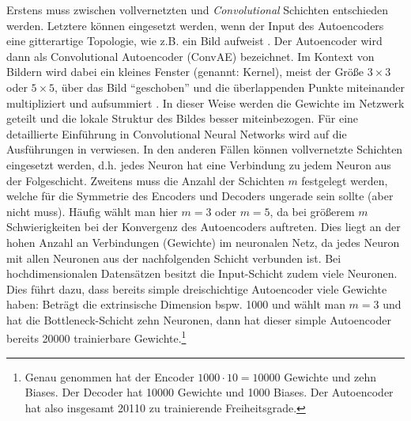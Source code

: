 Erstens muss zwischen vollvernetzten und \textit{Convolutional} Schichten entschieden werden.
Letztere können eingesetzt werden, wenn der Input des Autoencoders eine gitterartige Topologie, wie
z.B. ein Bild aufweist \parencite[330]{Goodfellow.2016}.
Der Autoencoder wird dann als Convolutional Autoencoder (ConvAE) bezeichnet. Im Kontext von Bildern
wird dabei ein kleines Fenster (genannt: Kernel), meist der Größe $3 \times 3$ oder $5 \times 5$,
über das Bild \enquote{geschoben} und die überlappenden Punkte miteinander multipliziert und
aufsummiert \parencite[333]{Goodfellow.2016}. In dieser Weise werden die Gewichte im Netzwerk geteilt und die
lokale Struktur des Bildes besser miteinbezogen. Für eine detaillierte Einführung in Convolutional
Neural Networks wird auf die Ausführungen in \textcite[330 -- 372]{Goodfellow.2016} verwiesen. In
den anderen Fällen können vollvernetzte Schichten eingesetzt werden, d.h. jedes Neuron hat eine
Verbindung zu jedem Neuron aus der Folgeschicht. Zweitens muss die Anzahl der Schichten $m$
festgelegt werden, welche für die Symmetrie des Encoders und Decoders ungerade sein sollte (aber
nicht muss). Häufig wählt man hier $m = 3$ oder $m = 5$, da bei größerem $m$ Schwierigkeiten bei
der Konvergenz des Autoencoders auftreten. Dies liegt an der hohen Anzahl an Verbindungen
(Gewichte) im neuronalen Netz, da jedes Neuron mit allen Neuronen aus der nachfolgenden Schicht
verbunden ist. Bei hochdimensionalen Datensätzen besitzt die Input-Schicht zudem viele Neuronen.
Dies führt dazu, dass bereits simple dreischichtige Autoencoder viele Gewichte haben: Beträgt die
extrinsische Dimension bspw. 1000 und wählt man $m=3$ und hat die Bottleneck-Schicht zehn Neuronen,
dann hat dieser simple Autoencoder bereits \num{20000} trainierbare Gewichte.\footnote{Genau
	genommen hat der Encoder $1000 \cdot 10 = \num{10000}$ Gewichte und zehn Biases. Der Decoder hat
	\num{10000} Gewichte und \num{1000} Biases. Der Autoencoder hat also insgesamt \num{20110} zu
	trainierende Freiheitsgrade.}

